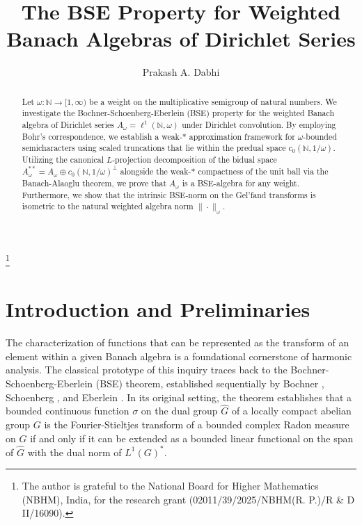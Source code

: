 \documentclass{amsart}
\theoremstyle{definition}
\theoremstyle{remark}
\numberwithin{equation}{section}
\begin{document}
\title[BSE Property for Weighted Dirichlet Series]{The BSE Property for Weighted Banach Algebras of Dirichlet Series}
\author[P. A. Dabhi]{Prakash A. Dabhi}
\address{Institute of Infrastructure Technology Research and Management (IITRAM), Ahmedabad - 380026, Gujarat, India}
\thanks{The author is grateful to the National Board for Higher Mathematics (NBHM), India, for the research grant (02011/39/2025/NBHM(R. P.)/R \& D II/16090).}
\begin{abstract}
Let $\omega: \mathbb{N} \to [1, \infty)$ be a weight on the multiplicative semigroup of natural numbers. We investigate the Bochner-Schoenberg-Eberlein (BSE) property for the weighted Banach algebra of Dirichlet series $A_\omega = \ell^1(\mathbb{N}, \omega)$ under Dirichlet convolution. By employing Bohr's correspondence, we establish a weak-$\ast$ approximation framework for $\omega$-bounded semicharacters using scaled truncations that lie within the predual space $c_0(\mathbb{N}, 1/\omega)$. Utilizing the canonical $L$-projection decomposition of the bidual space $A_\omega^{\ast\ast} = A_\omega \oplus c_0(\mathbb{N}, 1/\omega)^\perp$ alongside the weak-$\ast$ compactness of the unit ball via the Banach-Alaoglu theorem, we prove that $A_\omega$ is a BSE-algebra for any weight. Furthermore, we show that the intrinsic BSE-norm on the Gel'fand transforms is isometric to the natural weighted algebra norm $\|\cdot\|_\omega$.
\end{abstract}

\maketitle

\section{Introduction and Preliminaries}

The characterization of functions that can be represented as the transform of an element within a given Banach algebra is a foundational cornerstone of harmonic analysis. The classical prototype of this inquiry traces back to the Bochner-Schoenberg-Eberlein (BSE) theorem, established sequentially by Bochner \cite{bochner}, Schoenberg \cite{schoenberg}, and Eberlein \cite{eberlein}. In its original setting, the theorem establishes that a bounded continuous function $\sigma$ on the dual group $\widehat{G}$ of a locally compact abelian group $G$ is the Fourier-Stieltjes transform of a bounded complex Radon measure on $G$ if and only if it can be extended as a bounded linear functional on the span of $\widehat G$ with the dual norm of $L^1(G)^\ast$.
\end{document}
